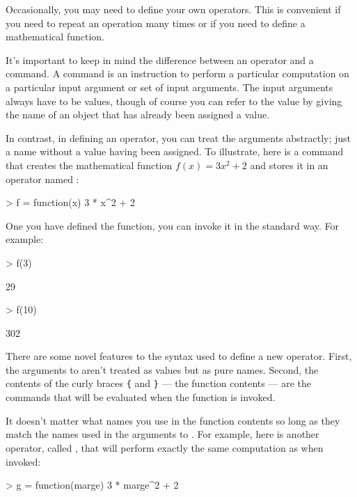 Occasionally, you may need to define your own operators.  This is
convenient if you need to repeat an operation many times or if you
need to define a mathematical function.

It's important to keep in mind the difference between an operator and
a command.  A command is an instruction to perform a particular
computation on a particular input argument or set of input arguments.
The input arguments always have to be values, though of course you can
refer to the value by giving the name of an object that has already
been assigned a value.

In contrast, in defining an operator, you can treat the arguments
abstractly; just a name without a value having been assigned.  To
illustrate, here is a command that creates the mathematical
function $f(x) = 3 x^2 + 2$ and stores it in an operator named :
\begin{Schunk}
\begin{Sinput}
> f = function(x) {
     3 * x^2 + 2
 }
\end{Sinput}
\end{Schunk}
One you have defined the function, you can invoke it in the standard
way.  For example:
\begin{Schunk}
\begin{Sinput}
> f(3)
\end{Sinput}
\begin{Soutput}
[1] 29
\end{Soutput}
\begin{Sinput}
> f(10)
\end{Sinput}
\begin{Soutput}
[1] 302
\end{Soutput}
\end{Schunk}

There are some novel features to the syntax used to define a new
operator.  First, the arguments to  aren't treated as
values but as pure names.  Second, the contents of the 
curly braces \verb+{+ and \verb+}+ ---  the
function contents --- are the commands that will be 
evaluated when the function is invoked.

It doesn't matter what names you use in the function contents so long
as they match the names used in the arguments to .  For
example, here is another operator, called , that will perform
exactly the same computation as  when invoked:
\begin{Schunk}
\begin{Sinput}
> g = function(marge) {
     3 * marge^2 + 2
 }
\end{Sinput}
\end{Schunk}

